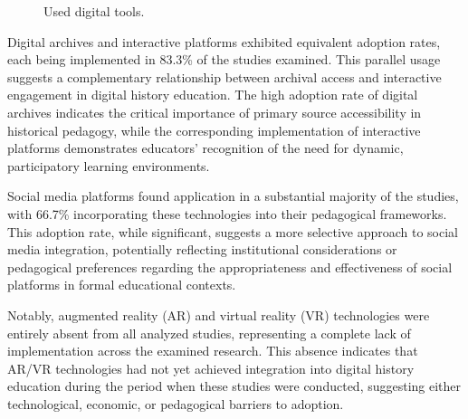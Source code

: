 \documentclass[
hf,
]{ceurart}
\begin{document}
\begin{figure}
    \centering
{}
    \caption{Used digital tools.}
    \label{used_instruments}
\end{figure}



Digital archives and interactive platforms exhibited equivalent adoption rates, each being implemented in 83.3\% of the studies examined. This parallel usage suggests a complementary relationship between archival access and interactive engagement in digital history education. The high adoption rate of digital archives indicates the critical importance of primary source accessibility in historical pedagogy, while the corresponding implementation of interactive platforms demonstrates educators' recognition of the need for dynamic, participatory learning environments.

Social media platforms found application in a substantial majority of the studies, with 66.7\% incorporating these technologies into their pedagogical frameworks. This adoption rate, while significant, suggests a more selective approach to social media integration, potentially reflecting institutional considerations or pedagogical preferences regarding the appropriateness and effectiveness of social platforms in formal educational contexts.

Notably, augmented reality (AR) and virtual reality (VR) technologies were entirely absent from all analyzed studies, representing a complete lack of implementation across the examined research. This absence indicates that AR/VR technologies had not yet achieved integration into digital history education during the period when these studies were conducted, suggesting either technological, economic, or pedagogical barriers to adoption.
\end{document}
